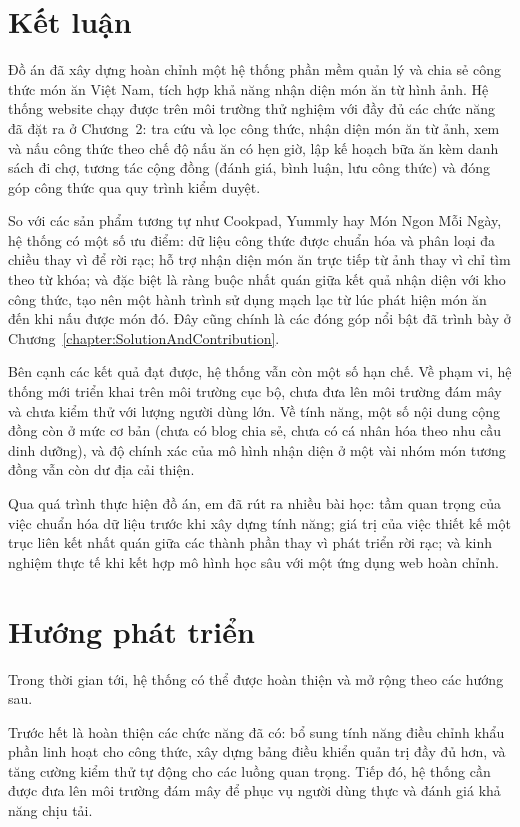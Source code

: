 \documentclass[../DoAn.tex]{subfiles}
\begin{document}
\section{Kết luận}
Đồ án đã xây dựng hoàn chỉnh một hệ thống phần mềm quản lý và chia sẻ công thức món ăn Việt Nam, tích hợp khả năng nhận diện món ăn từ hình ảnh. Hệ thống website chạy được trên môi trường thử nghiệm với đầy đủ các chức năng đã đặt ra ở Chương~2: tra cứu và lọc công thức, nhận diện món ăn từ ảnh, xem và nấu công thức theo chế độ nấu ăn có hẹn giờ, lập kế hoạch bữa ăn kèm danh sách đi chợ, tương tác cộng đồng (đánh giá, bình luận, lưu công thức) và đóng góp công thức qua quy trình kiểm duyệt.

So với các sản phẩm tương tự như Cookpad, Yummly hay Món Ngon Mỗi Ngày, hệ thống có một số ưu điểm: dữ liệu công thức được chuẩn hóa và phân loại đa chiều thay vì để rời rạc; hỗ trợ nhận diện món ăn trực tiếp từ ảnh thay vì chỉ tìm theo từ khóa; và đặc biệt là ràng buộc nhất quán giữa kết quả nhận diện với kho công thức, tạo nên một hành trình sử dụng mạch lạc từ lúc phát hiện món ăn đến khi nấu được món đó. Đây cũng chính là các đóng góp nổi bật đã trình bày ở Chương~\ref{chapter:SolutionAndContribution}.

Bên cạnh các kết quả đạt được, hệ thống vẫn còn một số hạn chế. Về phạm vi, hệ thống mới triển khai trên môi trường cục bộ, chưa đưa lên môi trường đám mây và chưa kiểm thử với lượng người dùng lớn. Về tính năng, một số nội dung cộng đồng còn ở mức cơ bản (chưa có blog chia sẻ, chưa có cá nhân hóa theo nhu cầu dinh dưỡng), và độ chính xác của mô hình nhận diện ở một vài nhóm món tương đồng vẫn còn dư địa cải thiện.

Qua quá trình thực hiện đồ án, em đã rút ra nhiều bài học: tầm quan trọng của việc chuẩn hóa dữ liệu trước khi xây dựng tính năng; giá trị của việc thiết kế một trục liên kết nhất quán giữa các thành phần thay vì phát triển rời rạc; và kinh nghiệm thực tế khi kết hợp mô hình học sâu với một ứng dụng web hoàn chỉnh.

\section{Hướng phát triển}
Trong thời gian tới, hệ thống có thể được hoàn thiện và mở rộng theo các hướng sau.

Trước hết là hoàn thiện các chức năng đã có: bổ sung tính năng điều chỉnh khẩu phần linh hoạt cho công thức, xây dựng bảng điều khiển quản trị đầy đủ hơn, và tăng cường kiểm thử tự động cho các luồng quan trọng. Tiếp đó, hệ thống cần được đưa lên môi trường đám mây để phục vụ người dùng thực và đánh giá khả năng chịu tải.
\end{document}
